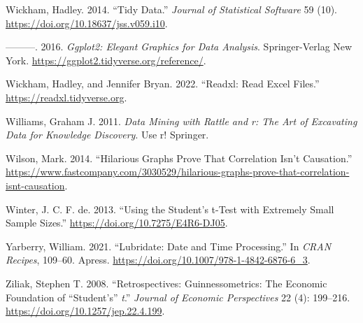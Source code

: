 \documentclass[
]{svmono}
\newlength{\cslhangindent}
\newlength{\cslentryspacingunit} %
\newenvironment{CSLReferences}[2] %
 {%
  \setlength{\parindent}{0pt}
  \ifodd #1
  \let\oldpar\par
  \def\par{\hangindent=\cslhangindent\oldpar}
  \fi
  \setlength{\parskip}{#2\cslentryspacingunit}
 }%
 {}
\begin{document}
\begin{CSLReferences}{1}{0}
\leavevmode{}%
Wickham, Hadley. 2014. {``Tidy Data.''} \emph{Journal of Statistical Software} 59 (10). \url{https://doi.org/10.18637/jss.v059.i10}.

\leavevmode{}%
---------. 2016. \emph{Ggplot2: Elegant Graphics for Data Analysis}. Springer-Verlag New York. \url{https://ggplot2.tidyverse.org/reference/}.

\leavevmode{}%
Wickham, Hadley, and Jennifer Bryan. 2022. {``Readxl: Read Excel Files.''} \url{https://readxl.tidyverse.org}.

\leavevmode{}%
Williams, Graham J. 2011. \emph{Data Mining with Rattle and r: The Art of Excavating Data for Knowledge Discovery}. Use r! Springer.

\leavevmode{}%
Wilson, Mark. 2014. {``Hilarious Graphs Prove That Correlation Isn{'}t Causation.''} \url{https://www.fastcompany.com/3030529/hilarious-graphs-prove-that-correlation-isnt-causation}.

\leavevmode{}%
Winter, J. C. F. de. 2013. {``Using the Student's t-Test with Extremely Small Sample Sizes.''} \url{https://doi.org/10.7275/E4R6-DJ05}.

\leavevmode{}%
Yarberry, William. 2021. {``Lubridate: Date and Time Processing.''} In \emph{{CRAN} Recipes}, 109--60. Apress. \url{https://doi.org/10.1007/978-1-4842-6876-6_3}.

\leavevmode{}%
Ziliak, Stephen T. 2008. {``Retrospectives: Guinnessometrics: The Economic Foundation of {``}Student's{''} {\emph{t}}.''} \emph{Journal of Economic Perspectives} 22 (4): 199--216. \url{https://doi.org/10.1257/jep.22.4.199}.

\end{CSLReferences}
\end{document}

